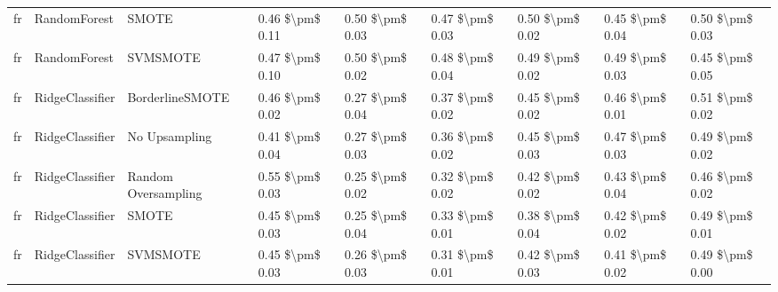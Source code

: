 \begin{tabular}{lllllllll}
      fr &                    RandomForest &                         SMOTE &     0.46 \$\textbackslash pm\$ 0.11 &           0.50 \$\textbackslash pm\$ 0.03 &       0.47 \$\textbackslash pm\$ 0.03 &        0.50 \$\textbackslash pm\$ 0.02 &                         0.45 \$\textbackslash pm\$ 0.04 &     0.50 \$\textbackslash pm\$ 0.03 \\
      fr &                    RandomForest &                      SVMSMOTE &     0.47 \$\textbackslash pm\$ 0.10 &           0.50 \$\textbackslash pm\$ 0.02 &       0.48 \$\textbackslash pm\$ 0.04 &        0.49 \$\textbackslash pm\$ 0.02 &                         0.49 \$\textbackslash pm\$ 0.03 &     0.45 \$\textbackslash pm\$ 0.05 \\
      fr &                 RidgeClassifier &               BorderlineSMOTE &     0.46 \$\textbackslash pm\$ 0.02 &           0.27 \$\textbackslash pm\$ 0.04 &       0.37 \$\textbackslash pm\$ 0.02 &        0.45 \$\textbackslash pm\$ 0.02 &                         0.46 \$\textbackslash pm\$ 0.01 &     0.51 \$\textbackslash pm\$ 0.02 \\
      fr &                 RidgeClassifier &                 No Upsampling &     0.41 \$\textbackslash pm\$ 0.04 &           0.27 \$\textbackslash pm\$ 0.03 &       0.36 \$\textbackslash pm\$ 0.02 &        0.45 \$\textbackslash pm\$ 0.03 &                         0.47 \$\textbackslash pm\$ 0.03 &     0.49 \$\textbackslash pm\$ 0.02 \\
      fr &                 RidgeClassifier &           Random Oversampling &     0.55 \$\textbackslash pm\$ 0.03 &           0.25 \$\textbackslash pm\$ 0.02 &       0.32 \$\textbackslash pm\$ 0.02 &        0.42 \$\textbackslash pm\$ 0.02 &                         0.43 \$\textbackslash pm\$ 0.04 &     0.46 \$\textbackslash pm\$ 0.02 \\
      fr &                 RidgeClassifier &                         SMOTE &     0.45 \$\textbackslash pm\$ 0.03 &           0.25 \$\textbackslash pm\$ 0.04 &       0.33 \$\textbackslash pm\$ 0.01 &        0.38 \$\textbackslash pm\$ 0.04 &                         0.42 \$\textbackslash pm\$ 0.02 &     0.49 \$\textbackslash pm\$ 0.01 \\
      fr &                 RidgeClassifier &                      SVMSMOTE &     0.45 \$\textbackslash pm\$ 0.03 &           0.26 \$\textbackslash pm\$ 0.03 &       0.31 \$\textbackslash pm\$ 0.01 &        0.42 \$\textbackslash pm\$ 0.03 &                         0.41 \$\textbackslash pm\$ 0.02 &     0.49 \$\textbackslash pm\$ 0.00 \\

\end{tabular}
